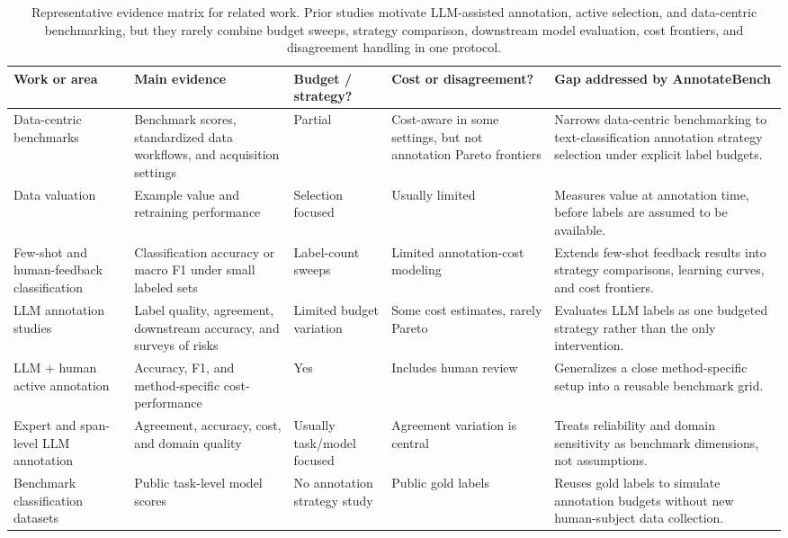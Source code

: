 \documentclass[11pt]{article}
\begin{document}
\begin{table}[H]
\centering
\caption{Representative evidence matrix for related work. Prior studies motivate LLM-assisted annotation, active selection, and data-centric benchmarking, but they rarely combine budget sweeps, strategy comparison, downstream model evaluation, cost frontiers, and disagreement handling in one protocol.}
\label{tab:literature-novelty}
\scriptsize
\setlength{\tabcolsep}{3.5pt}
\begin{tabularx}{\textwidth}{L{0.20\textwidth}L{0.20\textwidth}L{0.16\textwidth}L{0.16\textwidth}Y}
\toprule
Work or area & Main evidence & Budget / strategy? & Cost or disagreement? & Gap addressed by AnnotateBench \\
\midrule
Data-centric benchmarks \citep{mazumder2022dataperf,chen2023dataacquisition,gadre2023datacomp} & Benchmark scores, standardized data workflows, and acquisition settings & Partial & Cost-aware in some settings, but not annotation Pareto frontiers & Narrows data-centric benchmarking to text-classification annotation strategy selection under explicit label budgets. \\
Data valuation \citep{swayamdipta2020dataset,jiang2023opendataval,schoch2023dataselection} & Example value and retraining performance & Selection focused & Usually limited & Measures value at annotation time, before labels are assumed to be available. \\
Few-shot and human-feedback classification \citep{vidra2024humanfeedback,tunstall2022setfit} & Classification accuracy or macro F1 under small labeled sets & Label-count sweeps & Limited annotation-cost modeling & Extends few-shot feedback results into strategy comparisons, learning curves, and cost frontiers. \\
LLM annotation studies \citep{wang2021gpt3labeling,gilardi2023chatgpt,pangakis2024distillation,kuzman2024teacherstudent,tan2024llmannotation} & Label quality, agreement, downstream accuracy, and surveys of risks & Limited budget variation & Some cost estimates, rarely Pareto & Evaluates LLM labels as one budgeted strategy rather than the only intervention. \\
LLM + human active annotation \citep{rouzegar2024llmdriven} & Accuracy, F1, and method-specific cost-performance & Yes & Includes human review & Generalizes a close method-specific setup into a reusable benchmark grid. \\
Expert and span-level LLM annotation \citep{kasner2025spanannotators,tseng2025expertannotators} & Agreement, accuracy, cost, and domain quality & Usually task/model focused & Agreement variation is central & Treats reliability and domain sensitivity as benchmark dimensions, not assumptions. \\
Benchmark classification datasets \citep{malo2014good,li2002learning,casanueva2020efficient} & Public task-level model scores & No annotation strategy study & Public gold labels & Reuses gold labels to simulate annotation budgets without new human-subject data collection. \\
\bottomrule
\end{tabularx}
\end{table}
\end{document}
